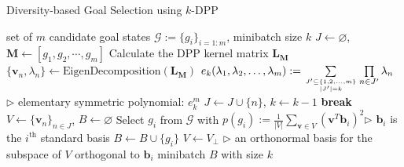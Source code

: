 \begin{algorithm}[t!]
\caption{Diversity-based Goal Selection using $k$-DPP}
\label{alg:goal_sample}
\begin{algorithmic}[1]
 \REQUIRE set of $m$ candidate goal states $\mathcal{G}:=\{g_{i}\}_{i=1:m}$, minibatch size $k$
 \STATE $J \leftarrow\varnothing$, $\mathbf{M} \leftarrow  [g_{1}, g_{2}, \cdots, g_{m}]$
 \STATE Calculate the DPP kernel matrix $\mathbf{L}_\mathbf{M}$
 \STATE $\{\boldsymbol{v}_{n}, \lambda_{n}\} \leftarrow \text{EigenDecomposition}(\mathbf{L}_\mathbf{M})$
 \STATE $e_k(\lambda_1,\lambda_2,\dots,\lambda_m) := 
  \sum\limits_{J^{\prime} \subseteq \{1,2,\dots,m\}\atop|J^{\prime}|=k} \prod\limits_{n \in J^{\prime}} \lambda_n$ \hfill{$\triangleright$ elementary symmetric polynomial: $e^{m}_{k}$}
 \STATE $J \leftarrow J \cup \{n\}$, $k \leftarrow k - 1$
 \STATE \textbf{break}
 \ENDIF
 \ENDIF
 \ENDFOR
 \STATE $V \leftarrow \{\boldsymbol{v}_{n}\}_{n \in J}$, $B \leftarrow \varnothing$
 \STATE Select $g_{i}$ from $\mathcal{G}$ with $p(g_{i}):=\frac{1}{|V|}\sum_{\boldsymbol{v}\in V}(\boldsymbol{v}^{T}\boldsymbol{b}_{i})^{2}$\hfill{$\triangleright$ $\boldsymbol{b}_{i}$ is the $i^{\text{th}}$ standard basis}
 \STATE $B \leftarrow B \cup \{g_{i}\}$
 \STATE $V \leftarrow V_{\perp}$ \hfill{$\triangleright$ an orthonormal basis for the subspace of $V$ orthogonal to $\boldsymbol{b}_{i}$}
 \ENDWHILE
 \RETURN minibatch $B$ with size $k$
\end{algorithmic}
\end{algorithm}

